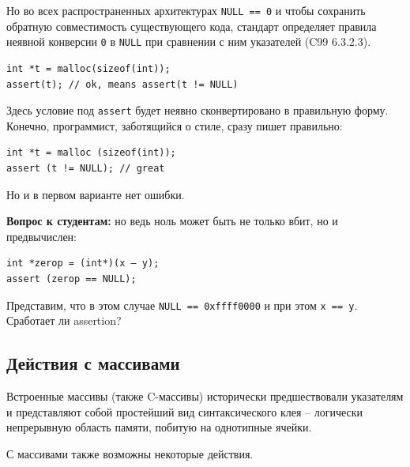 \documentclass[a4paper,12pt,oneside]{book}
\newif\ifanswers
\begin{document}
Но во всех распространенных архитектурах \lstinline!NULL == 0! и чтобы сохранить обратную совместимость существующего кода, стандарт определяет правила неявной конверсии \lstinline!0! в \lstinline!NULL! при сравнении с ним указателей (C99 6.3.2.3).

\begin{lstlisting}
int *t = malloc(sizeof(int));
assert(t); // ok, means assert(t != NULL)
\end{lstlisting}

Здесь условие под \lstinline!assert! будет неявно сконвертировано в правильную форму. Конечно, программист, заботящийся о стиле, сразу пишет правильно:

\begin{lstlisting}
int *t = malloc (sizeof(int));
assert (t != NULL); // great 
\end{lstlisting}

Но и в первом варианте нет ошибки.

\textbf{Вопрос к студентам:} но ведь ноль может быть не только вбит, но и предвычислен:

\begin{lstlisting}
int *zerop = (int*)(x – y);
assert (zerop == NULL);
\end{lstlisting}

Представим, что в этом случае \lstinline!NULL == 0xffff0000! и при этом \lstinline!x == y!. Сработает ли assertion?

\ifanswers
Правильный ответ: увы, нет. Стандарт гарантирует стабильное обращение с нулями времени компиляции, но не нулями времени исполнения (C99 6.3.2.3), иначе проверками пришлось бы завешивать слишком много кода.
\fi

\subsection{Действия с массивами}

Встроенные массивы (также C-массивы) исторически предшествовали указателям и представляют собой простейший вид синтаксического клея -- логически непрерывную область памяти, побитую на однотипные ячейки.

С массивами также возможны некоторые действия.
\end{document}

